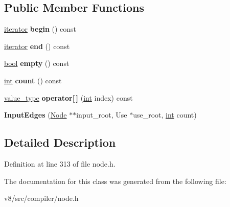 \subsection*{Public Member Functions}
\begin{DoxyCompactItemize}
\item 
\mbox{\label{classv8_1_1internal_1_1compiler_1_1Node_1_1InputEdges_a6c006a7a073972f94d0cc3eb1e23ab05}} 
\mbox{\hyperlink{classv8_1_1internal_1_1compiler_1_1Node_1_1InputEdges_1_1iterator}{iterator}} {\bfseries begin} () const
\item 
\mbox{\label{classv8_1_1internal_1_1compiler_1_1Node_1_1InputEdges_ab4cf9ec925d9084be895c606032991f4}} 
\mbox{\hyperlink{classv8_1_1internal_1_1compiler_1_1Node_1_1InputEdges_1_1iterator}{iterator}} {\bfseries end} () const
\item 
\mbox{\label{classv8_1_1internal_1_1compiler_1_1Node_1_1InputEdges_ae6ededf263bf5044f86ff5934a354448}} 
\mbox{\hyperlink{classbool}{bool}} {\bfseries empty} () const
\item 
\mbox{\label{classv8_1_1internal_1_1compiler_1_1Node_1_1InputEdges_ac3f69ad15064b9bf3ed3e01d5ced4115}} 
\mbox{\hyperlink{classint}{int}} {\bfseries count} () const
\item 
\mbox{\label{classv8_1_1internal_1_1compiler_1_1Node_1_1InputEdges_a85da44c810944321733f797752b05be5}} 
\mbox{\hyperlink{classv8_1_1internal_1_1compiler_1_1Edge}{value\+\_\+type}} {\bfseries operator\mbox{[}$\,$\mbox{]}} (\mbox{\hyperlink{classint}{int}} index) const
\item 
\mbox{\label{classv8_1_1internal_1_1compiler_1_1Node_1_1InputEdges_a98ed390928eca87914ef1b0e6faef1ce}} 
{\bfseries Input\+Edges} (\mbox{\hyperlink{classv8_1_1internal_1_1compiler_1_1Node}{Node}} $\ast$$\ast$input\+\_\+root, Use $\ast$use\+\_\+root, \mbox{\hyperlink{classint}{int}} count)
\end{DoxyCompactItemize}


\subsection{Detailed Description}


Definition at line 313 of file node.\+h.



The documentation for this class was generated from the following file\+:\begin{DoxyCompactItemize}
\item 
v8/src/compiler/node.\+h\end{DoxyCompactItemize}
